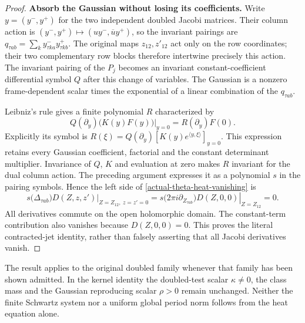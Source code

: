 \begin{proof}
\textbf{Absorb the Gaussian without losing its coefficients.}
Write $y=(y^-,y^+)$ for the two independent doubled Jacobi matrices.
Their column action is $(y^-,y^+)\mapsto
(u y^-,\overline u y^+)$, so the invariant pairings are
$q_{\tau ab}=\sum_k y^-_{\tau ka}y^+_{\tau kb}$.
The original maps $z_{12},z'_{12}$ act only on the row coordinates;
their two complementary row blocks therefore intertwine precisely
this action. The invariant pairing of the $P_j$ becomes an invariant
constant-coefficient differential symbol $Q$ after this change of
variables. The Gaussian is a nonzero frame-dependent scalar times
the exponential of a linear combination of the $q_{\tau ab}$.

Leibniz's rule gives a finite polynomial $R$ characterized by
\[
 Q(\partial_y)\bigl(K(y)F(y)\bigr)\big|_{y=0}
       =R(\partial_y)F(0).
\]
Explicitly its symbol is
$R(\xi)=Q(\partial_y)[K(y)e^{\langle y,\xi\rangle}]_{y=0}$.
This expression retains every Gaussian coefficient, factorial and
the constant determinant multiplier. Invariance of $Q$, $K$ and
evaluation at zero makes $R$ invariant for the dual column action.
The preceding argument expresses it as a polynomial $s$ in the
pairing symbols. Hence the left side of
\eqref{actual-theta-heat-vanishing} is
\[
 \left.s\bigl(\Delta_{\tau ab}\bigr)D(Z,z,z')
                                      \right|_{Z=Z_{12},\ z=z'=0}
 =\left.s\bigl(2\pi i\partial_{Z_{\tau ab}}\bigr)
                                      D(Z,0,0)\right|_{Z=Z_{12}}=0.
\]
All derivatives commute on the open holomorphic domain. The constant-term
contribution also vanishes because $D(Z,0,0)=0$. This proves the
literal contracted-jet identity, rather than falsely asserting that
all Jacobi derivatives vanish.
\end{proof}

The result applies to the original doubled family whenever that family
has been shown admitted. In the kernel identity the doubled-test
scalar $\kappa\ne0$, the class mass and the Gaussian reproducing
scalar $\rho>0$ remain unchanged. Neither the finite Schwartz system
nor a uniform global period norm follows from the heat equation alone.
